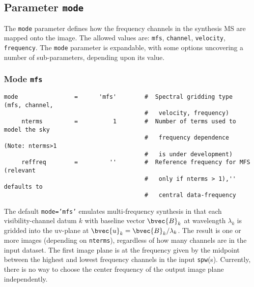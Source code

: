 %
%
\subsection{Parameter {\tt mode} }
\label{section:im.pars.mode}

The {\tt mode} parameter defines how the frequency channels in the
synthesis MS are mapped onto the image.  The allowed values are:
{\tt mfs}, {\tt channel}, {\tt velocity}, {\tt frequency}.
The {\tt mode} parameter
is expandable, with some options uncovering a number of
sub-parameters, depending upon its value.

\subsubsection{Mode {\tt mfs} }
\label{section:im.pars.mode.mfs}
\small
\begin{verbatim}
mode                =      'mfs'        #  Spectral gridding type (mfs, channel,
                                        #   velocity, frequency)
     nterms         =          1        #  Number of terms used to model the sky
                                        #   frequency dependence (Note: nterms>1
                                        #   is under development)
     reffreq        =         ''        #  Reference frequency for MFS (relevant
                                        #   only if nterms > 1),'' defaults to
                                        #   central data-frequency
\end{verbatim}
\normalsize

The default {\tt mode='mfs'} emulates multi-frequency synthesis in
that each visibility-channel datum $k$ with baseline vector
$\bvec{B}_k$ at wavelength $\lambda_k$ is gridded into the uv-plane at
$\bvec{u}_k = \bvec{B}_k/\lambda_k$.  The result is one or more images
(depending on {\tt nterms}), regardless of how many channels are in the input dataset.
The first image plane is at the frequency given by the midpoint between
the highest and lowest frequency channels in the input {\tt spw}(s).
Currently, there is no way to choose the center frequency of the 
output image plane independently.

